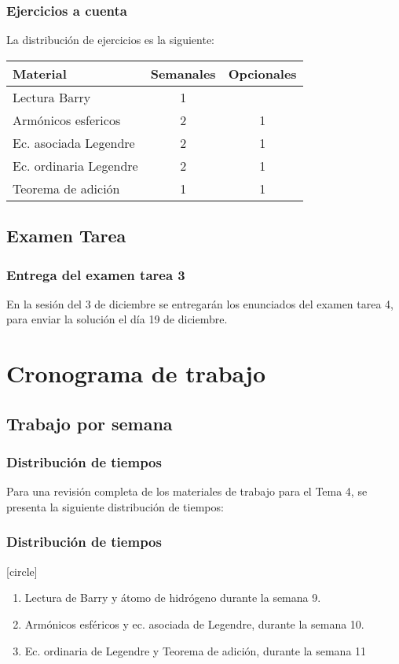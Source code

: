 \documentclass[12pt]{beamer}
\begin{document}
\begin{frame}
\frametitle{Ejercicios a cuenta}
La distribución de ejercicios es la siguiente:
\pause
\begin{table}
\centering
\begin{tabular}{l c c}
Material & Semanales & Opcionales \\ \hline
Lectura Barry & 1 &  \\ \hline
Armónicos esfericos  & 2 & 1 \\ \hline
Ec. asociada Legendre & 2 & 1 \\ \hline    
Ec. ordinaria Legendre & 2 & 1 \\ \hline    
Teorema de adición & 1 & 1 \\ \hline    
\end{tabular}
\end{table}
\end{frame}

\subsection{Examen Tarea}

\begin{frame}
\frametitle{Entrega del examen tarea 3}
En la sesión del 3 de diciembre se entregarán los enunciados del examen tarea 4, \pause para enviar la solución el día 19 de diciembre.
\end{frame}



\section{Cronograma de trabajo}
\subsection{Trabajo por semana}

\begin{frame}
\frametitle{Distribución de tiempos}
Para una revisión completa de los materiales de trabajo para el Tema 4, se presenta la siguiente distribución de tiempos:
\end{frame}
\begin{frame}
\frametitle{Distribución de tiempos}
[circle]
\begin{enumerate}
\item Lectura de Barry y átomo de hidrógeno durante la semana 9.
\item Armónicos esféricos y ec. asociada de Legendre, durante la semana 10.
\item Ec. ordinaria de Legendre y Teorema de adición, durante la semana 11
\end{enumerate}
\end{frame}
\end{document}

